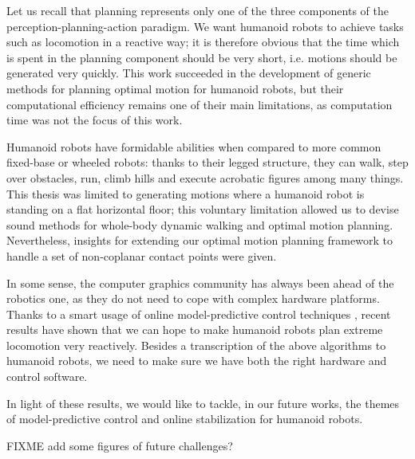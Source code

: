 Let us recall that planning represents only one of the three
components of the perception-planning-action paradigm. We want
humanoid robots to achieve tasks such as locomotion in a reactive way;
it is therefore obvious that the time which is spent in the planning
component should be very short, i.e. motions should be generated very
quickly. This work succeeded in the development of generic methods for
planning optimal motion for humanoid robots, but their computational
efficiency remains one of their main limitations, as computation
time was not the focus of this work.

Humanoid robots have formidable abilities when compared to more common
fixed-base or wheeled robots: thanks to their legged structure, they
can walk, step over obstacles, run, climb hills and execute acrobatic
figures among many things. This thesis was limited to generating
motions where a humanoid robot is standing on a flat horizontal floor;
this voluntary limitation allowed us to devise sound methods for
whole-body dynamic walking and optimal motion planning. Nevertheless,
insights for extending our optimal motion planning framework to handle
a set of non-coplanar contact points were given.

In some sense, the computer graphics community has always been ahead
of the robotics one, as they do not need to cope with complex hardware
platforms. Thanks to a smart usage of online model-predictive control
techniques \cite{coros2010generalized,tassa2012synthesis}, recent
results have shown that we can hope to make humanoid robots plan
extreme locomotion very reactively. Besides a transcription of the
above algorithms to humanoid robots, we need to make sure we have both
the right hardware and control software.

\bigskip

In light of these results, we would like to tackle, in our future
works, the themes of model-predictive control and online stabilization
for humanoid robots.

\bigskip

FIXME add some figures of future challenges?

